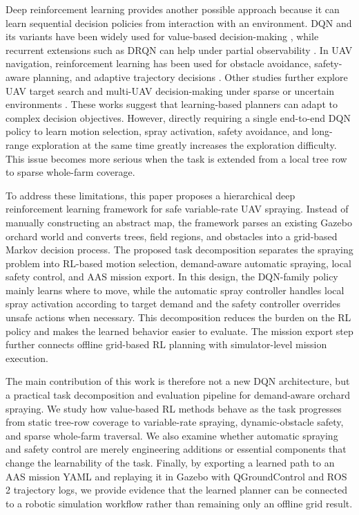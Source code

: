 \documentclass[conference,10pt]{IEEEtran}
\begin{document}
Deep reinforcement learning provides another possible approach because it can learn sequential decision policies from interaction with an environment. DQN and its variants have been widely used for value-based decision-making \cite{mnih2015dqn,vanhasselt2016double,wang2016dueling,hessel2018rainbow}, while recurrent extensions such as DRQN can help under partial observability \cite{hausknecht2015drqn}. In UAV navigation, reinforcement learning has been used for obstacle avoidance, safety-aware planning, and adaptive trajectory decisions \cite{singla2021memory,liao2025moving,carvalho2025qlearning}. Other studies further explore UAV target search and multi-UAV decision-making under sparse or uncertain environments \cite{vanessen2025weeds,luo2023multiUavSearch,bai2023muwSurvey}. These works suggest that learning-based planners can adapt to complex decision objectives. However, directly requiring a single end-to-end DQN policy to learn motion selection, spray activation, safety avoidance, and long-range exploration at the same time greatly increases the exploration difficulty. This issue becomes more serious when the task is extended from a local tree row to sparse whole-farm coverage.

To address these limitations, this paper proposes a hierarchical deep reinforcement learning framework for safe variable-rate UAV spraying. Instead of manually constructing an abstract map, the framework parses an existing Gazebo orchard world and converts trees, field regions, and obstacles into a grid-based Markov decision process. The proposed task decomposition separates the spraying problem into RL-based motion selection, demand-aware automatic spraying, local safety control, and AAS mission export. In this design, the DQN-family policy mainly learns where to move, while the automatic spray controller handles local spray activation according to target demand and the safety controller overrides unsafe actions when necessary. This decomposition reduces the burden on the RL policy and makes the learned behavior easier to evaluate. The mission export step further connects offline grid-based RL planning with simulator-level mission execution.

The main contribution of this work is therefore not a new DQN architecture, but a practical task decomposition and evaluation pipeline for demand-aware orchard spraying. We study how value-based RL methods behave as the task progresses from static tree-row coverage to variable-rate spraying, dynamic-obstacle safety, and sparse whole-farm traversal. We also examine whether automatic spraying and safety control are merely engineering additions or essential components that change the learnability of the task. Finally, by exporting a learned path to an AAS mission YAML and replaying it in Gazebo with QGroundControl and ROS 2 trajectory logs, we provide evidence that the learned planner can be connected to a robotic simulation workflow rather than remaining only an offline grid result.
\end{document}
